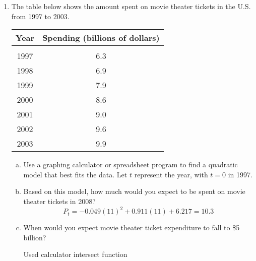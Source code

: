 \begin{enumerate}
\item The table below shows the amount spent on movie theater tickets in the U.S. from 1997 to 2003.
\begin{center}
\begin{tabular}{c c}
\textbf{Year} & \textbf{Spending (billions of dollars)}\\
\hline
 & \\
1997 & 6.3\\
1998 & 6.9\\
1999 & 7.9\\
2000 & 8.6\\
2001 & 9.0\\
2002 & 9.6\\
2003 & 9.9
\end{tabular}
\end{center}
\begin{enumerate}[(a)]
\item Use a graphing calculator or spreadsheet program to find a quadratic model that best fits the data.  Let $t$ represent the year, with $t=0$ in 1997. 
\item Based on this model, how much would you expect to be spent on movie theater tickets in 2008? 
\[P_t = -0.049(11)^2 + 0.911(11) + 6.217 = 10.3\]
\item When would you expect movie theater ticket expenditure to fall to \$5 billion? 
\begin{center}
Used calculator intersect function
\end{center}
\end{enumerate}


\end{enumerate}
